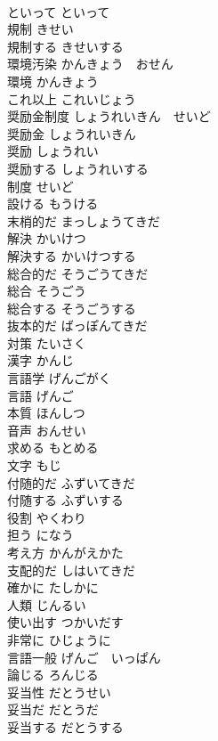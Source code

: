 \documentclass[8pt]{extreport}
\begin{document}
\begin{CJK}{UTF8}{min}
\\	といって	といって	
\\	規制	きせい	
\\	規制する	きせいする	
\\	環境汚染	かんきょう　おせん	
\\	環境	かんきょう	
\\	これ以上	これいじょう	
\\	奨励金制度	しょうれいきん　せいど	
\\	奨励金	しょうれいきん	
\\	奨励	しょうれい	
\\	奨励する	しょうれいする	
\\	制度	せいど	
\\	設ける	もうける	
\\	末梢的だ	まっしょうてきだ	
\\	解決	かいけつ	
\\	解決する	かいけつする	
\\	総合的だ	そうごうてきだ	
\\	総合	そうごう	
\\	総合する	そうごうする	
\\	抜本的だ	ばっぽんてきだ	
\\	対策	たいさく	
\\	漢字	かんじ	
\\	言語学	げんごがく	
\\	言語	げんご	
\\	本質	ほんしつ	
\\	音声	おんせい	
\\	求める	もとめる	
\\	文字	もじ	
\\	付随的だ	ふずいてきだ	
\\	付随する	ふずいする	
\\	役割	やくわり	
\\	担う	になう	
\\	考え方	かんがえかた	
\\	支配的だ	しはいてきだ	
\\	確かに	たしかに	
\\	人類	じんるい	
\\	使い出す	つかいだす	
\\	非常に	ひじょうに	
\\	言語一般	げんご　いっぱん	
\\	論じる	ろんじる	
\\	妥当性	だとうせい	
\\	妥当だ	だとうだ	
\\	妥当する	だとうする	

\end{CJK}
\end{document}
